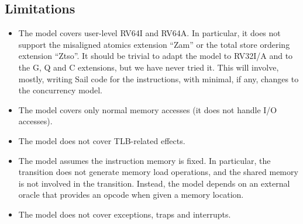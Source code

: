 \subsection{Limitations}\label{sec:omm:limitations}
\begin{itemize}
\item The model covers user-level RV64I and RV64A.
In particular, it does not support the misaligned atomics extension ``Zam'' or the total store ordering extension ``Ztso''.
It should be trivial to adapt the model to RV32I/A and to the G, Q and C extensions, but we have never tried it. This will involve, mostly, writing Sail code for the instructions, with minimal, if any, changes to the concurrency model.
\item The model covers only normal memory accesses (it does not handle I/O accesses).
\item The model does not cover TLB-related effects.
\item The model assumes the instruction memory is fixed.
In particular, the  transition does not generate memory load operations, and the shared memory is not involved in the transition.
Instead, the model depends on an external oracle that provides an opcode when given a memory location.
\item The model does not cover exceptions, traps and interrupts.
\end{itemize}

